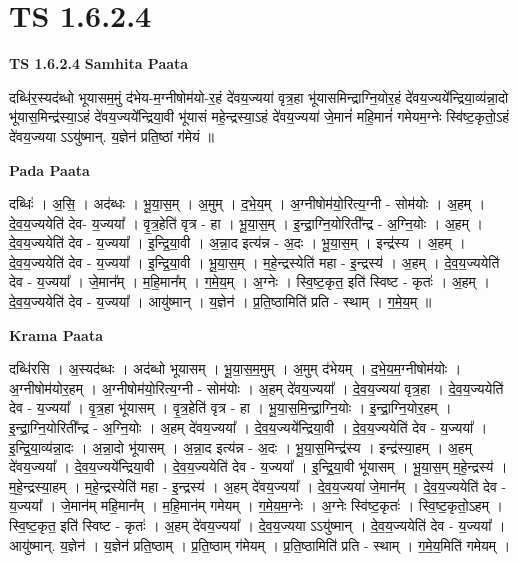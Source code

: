 \documentclass[17pt]{extarticle}
\begin{document}
\section{ TS 1.6.2.4 }

\textbf{TS 1.6.2.4 } \newline
\textbf{Samhita Paata} \newline

दब्धि॑र॒स्यद॑ब्धो भूयासम॒मुं द॑भेय-म॒ग्नीषोम॑यो-र॒हं दे॑वय॒ज्यया॑ वृत्र॒हा भू॑यासमिन्द्राग्नि॒योर॒हं दे॑वय॒ज्यये᳚न्द्रिया॒व्य॑न्ना॒दो भू॑यास॒मिन्द्र॑स्या॒ऽहं दे॑वय॒ज्यये᳚न्द्रिया॒वी भू॑यासं महे॒न्द्रस्या॒ऽहं दे॑वय॒ज्यया॑ जे॒मानं॑ महि॒मानं॑ गमेयम॒ग्नेः स्वि॑ष्ट॒कृतो॒ऽहं दे॑वय॒ज्यया ऽऽयु॑ष्मान्. य॒ज्ञेन॑ प्रति॒ष्ठां ग॑मेयं ॥ \newline

\textbf{Pada Paata} \newline

दब्धिः॑ । अ॒सि॒ । अद॑ब्धः । भू॒या॒स॒म् । अ॒मुम् । द॒भे॒य॒म् । अ॒ग्नीषोम॑यो॒रित्य॒ग्नी - सोम॑योः । अ॒हम् । दे॒व॒य॒ज्ययेति॑ देव- य॒ज्यया᳚ । वृ॒त्र॒हेति॑ वृत्र - हा । भू॒या॒स॒म् । इ॒न्द्रा॒ग्नि॒योरिती᳚न्द्र - अ॒ग्नि॒योः । अ॒हम् । दे॒व॒य॒ज्ययेति॑ देव - य॒ज्यया᳚ । इ॒न्द्रि॒या॒वी । अ॒न्ना॒द इत्य॑न्न - अ॒दः । भू॒या॒स॒म् । इन्द्र॑स्य । अ॒हम् । दे॒व॒य॒ज्ययेति॑ देव - य॒ज्यया᳚ । इ॒न्द्रि॒या॒वी । भू॒या॒स॒म् । म॒हे॒न्द्रस्येति॑ महा - इ॒न्द्रस्य॑ । अ॒हम् । दे॒व॒य॒ज्ययेति॑ देव - य॒ज्यया᳚ । जे॒मान᳚म् । म॒हि॒मान᳚म् । ग॒मे॒य॒म् । अ॒ग्नेः । स्वि॒ष्ट॒कृत॒ इति॑ स्विष्ट - कृतः॑ । अ॒हम् । दे॒व॒य॒ज्ययेति॑ देव - य॒ज्यया᳚ । आयु॑ष्मान् । य॒ज्ञेन॑ । प्र॒ति॒ष्ठामिति॑ प्रति - स्थाम् । ग॒मे॒य॒म् ॥  \newline


\textbf{Krama Paata} \newline

दब्धि॑रसि । अ॒स्यद॑ब्धः । अद॑ब्धो भूयासम् । भू॒या॒स॒म॒मुम् । अ॒मुम् द॑भेयम् । द॒भे॒य॒म॒ग्नीषोम॑योः । अ॒ग्नीषोम॑योर॒हम् । अ॒ग्नीषोम॑यो॒रित्य॒ग्नी - सोम॑योः । अ॒हम् दे॑वय॒ज्यया᳚ । दे॒व॒य॒ज्यया॑ वृत्र॒हा । दे॒व॒य॒ज्ययेति॑ देव - य॒ज्यया᳚ । वृ॒त्र॒हा भू॑यासम् । वृ॒त्र॒हेति॑ वृत्र - हा । भू॒या॒स॒मि॒न्द्रा॒ग्नि॒योः । इ॒न्द्रा॒ग्नि॒योर॒हम् । इ॒न्द्रा॒ग्नि॒योरिती᳚न्द्र - अ॒ग्नि॒योः । अ॒हम् दे॑वय॒ज्यया᳚ । दे॒व॒य॒ज्यये᳚न्द्रिया॒वी । दे॒व॒य॒ज्ययेति॑ देव - य॒ज्यया᳚ । इ॒न्द्रि॒या॒व्य॑न्ना॒दः । अ॒न्ना॒दो भू॑यासम् । अ॒न्ना॒द इत्य॑न्न - अ॒दः । भू॒या॒स॒मिन्द्र॑स्य । इन्द्र॑स्या॒हम् । अ॒हम् दे॑वय॒ज्यया᳚ । दे॒व॒य॒ज्यये᳚न्द्रिया॒वी । दे॒व॒य॒ज्ययेति॑ देव - य॒ज्यया᳚ । इ॒न्द्रि॒या॒वी भू॑यासम् । भू॒या॒स॒म् म॒हे॒न्द्रस्य॑ । म॒हे॒न्द्रस्या॒हम् । म॒हे॒न्द्रस्येति॑ महा - इ॒न्द्रस्य॑ । अ॒हम् दे॑वय॒ज्यया᳚ । दे॒व॒य॒ज्यया॑ जे॒मान᳚म् । दे॒व॒य॒ज्ययेति॑ देव - य॒ज्यया᳚ । जे॒मान॑म् महि॒मान᳚म् । म॒हि॒मान॑म् गमेयम् । ग॒मे॒य॒म॒ग्नेः । अ॒ग्नेः स्वि॑ष्ट॒कृतः॑ । स्वि॒ष्ट॒कृतो॒ऽहम् । स्वि॒ष्ट॒कृत॒ इति॑ स्विष्ट - कृतः॑ । अ॒हम् दे॑वय॒ज्यया᳚ । दे॒व॒य॒ज्यया ऽऽयु॑ष्मान् । दे॒व॒य॒ज्ययेति॑ देव - य॒ज्यया᳚ । आयु॑ष्मान्. य॒ज्ञेन॑ । य॒ज्ञेन॑ प्रति॒ष्ठाम् । प्र॒ति॒ष्ठाम् ग॑मेयम् । प्र॒ति॒ष्ठामिति॑ प्रति - स्थाम् । ग॒मे॒य॒मिति॑ गमेयम् । \newline
\end{document}

